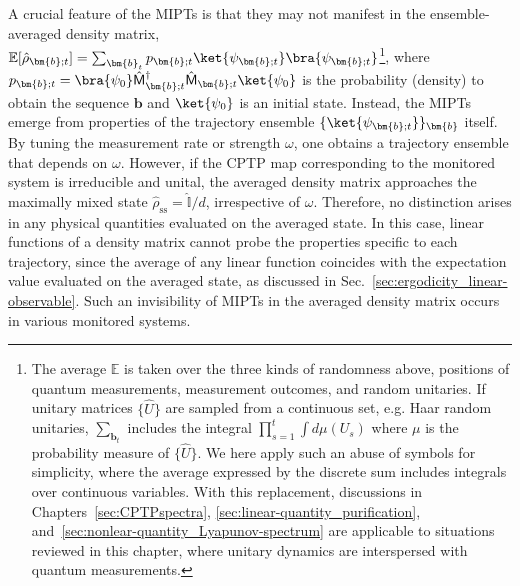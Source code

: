 \documentclass[preprint,pteplogo]{ptephy_v2}%
\numberwithin{equation}{section}
\theoremstyle{definition}
\begin{document}
A crucial feature of the MIPTs is that they may not manifest in the ensemble-averaged density matrix, $\mathbb{E}[\hat{\rho}_{\bm{b};t}]=\sum_{\bm{b}_t} p_{\bm{b};t}\ket{\psi_{\bm{b};t}}\bra{\psi_{\bm{b};t}}$\footnote{
The average $\mathbb{E}$ is taken over the three kinds of randomness above, positions of quantum measurements, measurement outcomes, and random unitaries.
If unitary matrices $\{\hat{U}\}$ are sampled from a continuous set, e.g. Haar random unitaries, $\sum_{\bm{b}_t}$ includes the integral $\prod_{s=1}^t\int d\mu(U_s)$ where $\mu$ is the probability measure of $\{\hat{U}\}$. 
We here apply such an abuse of symbols for simplicity, where the average expressed by the discrete sum includes integrals over continuous variables.
With this replacement, discussions in Chapters~\ref{sec:CPTPspectra}, \ref{sec:linear-quantity_purification}, and~\ref{sec:nonlear-quantity_Lyapunov-spectrum} are applicable to situations reviewed in this chapter, where unitary dynamics are interspersed with quantum measurements.
}, where $p_{\bm{b};t}=\bra{\psi_0}\hat{\mathsf{M}}_{\bm{b};t}^\dagger\hat{\mathsf{M}}_{\bm{b};t}\ket{\psi_0}$ is the probability (density) to obtain the sequence $\bm{b}$ and $\ket{\psi_0}$ is an initial state.
Instead, the MIPTs emerge from properties of the trajectory ensemble $\{ \ket{\psi_{\bm{b};t}} \}_{\bm{b}}$ itself.
By tuning the measurement rate or strength $\omega$, one obtains a trajectory ensemble that depends on $\omega$.
However, if the CPTP map corresponding to the monitored system is irreducible and unital, the averaged density matrix approaches the maximally mixed state $\hat{\rho}_\mathrm{ss}=\hat{\mathbb{I}}/d$, irrespective of $\omega$.
Therefore, no distinction arises in any physical quantities evaluated on the averaged state. 
In this case, linear functions of a density matrix cannot probe the properties specific to each trajectory, since the average of any linear function coincides with the expectation value evaluated on the averaged state, as discussed in Sec.~\ref{sec:ergodicity_linear-observable}.
Such an invisibility of MIPTs in the averaged density matrix occurs in various monitored systems. 
\end{document}
